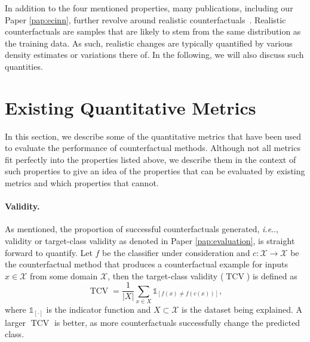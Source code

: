 \documentclass[11pt,a4paper,twoside,openright,final]{memoir}
\makeatletter
\DeclareRobustCommand\onedot{\futurelet\@let@token\@onedot}
\def\@onedot{\ifx\@let@token.\else.\null\fi\xspace}
\def\ie{\emph{i.e}\onedot} \def\Ie{\emph{I.e}\onedot}
\newcommand*{\paperref}[1]{Paper \hyperref[#1]{\ref{#1}}}
\makeatother
\begin{document}
In addition to the four mentioned properties, many publications, including our \paperref{pap:ecinn}, further revolve around realistic counterfactuals~\cite{Singla2019, flowcounterfactuals, Rodriguez2021, VanLooveren2019}. %
Realistic counterfactuals are samples that are likely to stem from the same distribution as the training data. 
As such, realistic changes are typically quantified by various density estimates or variations there of.
In the following, we will also discuss such quantities. 

\section{Existing Quantitative Metrics}\label{sec:existing-metrics}

In this section, we describe some of the quantitative metrics that have been used to evaluate the performance of counterfactual methods.
Although not all metrics fit perfectly into the properties listed above, we describe them in the context of such properties to give an idea of the properties that can be evaluated by existing metrics and which properties that cannot. 

\paragraph{Validity.}
As mentioned, the proportion of successful counterfactuals generated, \ie, validity or target-class validity as denoted in \paperref{pap:evaluation}, is straight forward to quantify.
Let $f$ be the classifier under consideration and $c: \mathcal{X} \rightarrow \mathcal{X}$ be the counterfactual method that produces a counterfactual example for inputs $x\in \mathcal{X}$ from some domain $\mathcal{X}$, then the target-class validity ($\operatorname{TCV}$) is defined as
\begin{equation}\label{eq:tcv}
    \operatorname{TCV} = \frac{1}{|X|} \sum_{x \in X} \mathbb{1}_{[ f(x) \neq f( c(x) )]}, 
\end{equation}
where $\mathbb{1}_{[\cdot]}$ is the indicator function and $X \subset \mathcal{X}$ is the dataset being explained.
A larger $\operatorname{TCV}$ is better, as more counterfactuals successfully change the predicted class.
\end{document}
